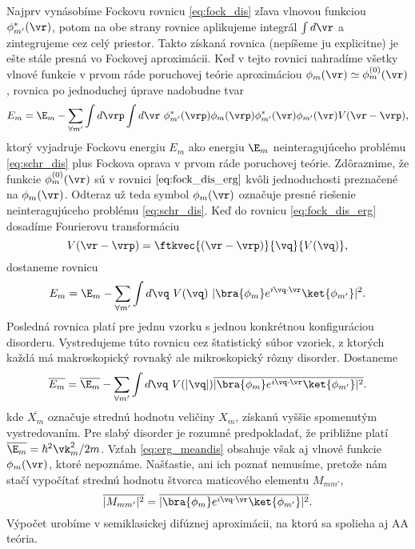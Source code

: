 Najprv vynásobíme Fockovu rovnicu \eqref{eq:fock_dis} zľava vlnovou funkciou $\phi^*_{m'}(\vr)$, potom na obe strany rovnice aplikujeme integrál $\int d \vr$ a zintegrujeme cez celý priestor.
Takto získaná rovnica (nepíšeme ju explicitne) je ešte stále presná vo Fockovej aproximácii. Keď v tejto rovnici nahradíme všetky vlnové funkcie v prvom ráde poruchovej teórie aproximáciou 
$\phi_m(\vr) \simeq \phi_m^{(0)}(\vr)$, rovnica po jednoduchej úprave nadobudne tvar 
\begin{equation}
 \label{eq:fock_dis_erg}
 E_m=\E_m-\sum_{\forall m'} \int d\vrp \int d\vr\ \phi^*_{m'}(\vrp) \phi_{m}(\vrp)\phi^*_{m'}(\vr)\phi_{m'}(\vr)V(\vr-\vrp) \text{,}
\end{equation}
ktorý vyjadruje Fockovu energiu $E_m$ ako energiu $\E_m$ neinteragujúceho problému \eqref{eq:schr_dis} plus Fockova oprava v prvom ráde poruchovej teórie. Zdôraznime, že funkcie 
$\phi_m^{(0)}(\vr)$ sú v rovnici $\eqref{eq:fock_dis_erg}$  kvôli jednoduchosti preznačené na $\phi_m(\vr)$. Odteraz už teda symbol $\phi_m(\vr)$
označuje presné riešenie neinteragujúceho problému \eqref{eq:schr_dis}.
Keď do rovnicu \eqref{eq:fock_dis_erg} dosadíme Fourierovu transformáciu
\begin{equation}
 \label{eq:V_ft}
 V(\vr-\vrp)=\ftkvec{(\vr-\vrp)}{\vq}{V(\vq)}\text{,}
\end{equation}
dostaneme rovnicu
\begin{equation}
\label{eq:erg_V_ft}
 E_m=\E_m-\sum_{\forall m'} \int d\vq\ V(\vq) \ |\bra{\phi_m}e^{i\vq\cdot\vr}\ket{\phi_{m'}}|^2 \text{.}
\end{equation}
Posledná rovnica platí pre jednu vzorku s jednou konkrétnou konfiguráciou disorderu. Vystredujeme túto rovnicu cez štatistický súbor vzoriek, z ktorých
každá má makroskopický rovnaký ale mikroskopický rôzny disorder. Dostaneme
\begin{equation}
\label{eq:erg_meandis}
 \overline{E_m}=\overline{\E_m}-\sum_{\forall m'} \int d\vq\ V(|\vq|) \overline{|\bra{\phi_m}e^{i\vq\cdot\vr}\ket{\phi_{m'}}|^2} \text{.}
\end{equation}
kde $\overline{X_m}$ označuje strednú hodnotu veličiny $X_m$, získanú vyššie spomenutým vystredovaním. Pre slabý disorder je rozumné predpokladať, že približne platí $\overline{\E_m}= \hbar^2 \vk_m^2/2m$.
Vzťah \eqref{eq:erg_meandis} obsahuje však aj vlnové funkcie
$\phi_m(\vr)$, ktoré nepoznáme. Našťastie, 
ani ich poznať nemusíme, pretože nám stačí vypočítať strednú hodnotu štvorca maticového elementu $M_{mm'}$,
\begin{equation}
\label{eq:aa_matrix_element}
\overline{| M_{mm'}|^2} =\overline{|\bra{\phi_m}e^{i\vq\cdot\vr}\ket{\phi_{m'}}|^2} \text{.}
\end{equation}
Výpočet urobíme v semiklasickej difúznej aproximácii, na ktorú sa spolieha aj AA teória.

